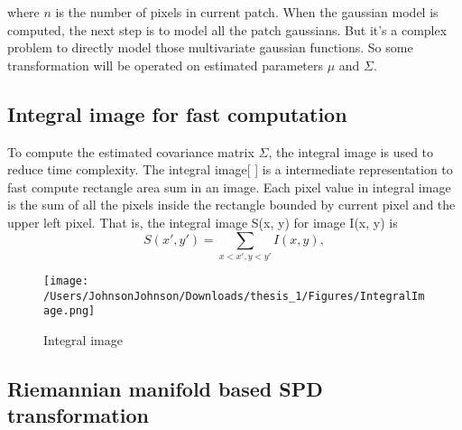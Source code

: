 where $n$ is the number of pixels in current patch. When the gaussian model is computed, the next step is to model all the patch gaussians. But it's a complex problem to directly model those multivariate gaussian functions. So some transformation will be operated on estimated parameters $\mu$ and $\Sigma$.

\subsection{Integral image for fast computation}

To compute the estimated covariance matrix $\Sigma$, the integral image is used to reduce time complexity. The integral image[ ] is a intermediate representation to fast compute rectangle area sum in an image. Each pixel value in integral image is the sum of all the pixels inside the rectangle bounded by current pixel and the upper left pixel. That is, the integral image S(x, y) for image I(x, y) is 
\begin{equation}
S(x', y') = \sum_{x<x', y <y'} I(x, y),
\end{equation}

\begin{figure}[H]
\centering
\texttt{[image: /Users/JohnsonJohnson/Downloads/thesis\_1/Figures/IntegralImage.png]}
\caption{Integral image}
\vspace{0em}
\end{figure} 



\subsection{Riemannian manifold based SPD transformation}

